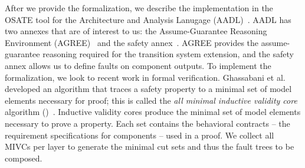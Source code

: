 After we provide the formalization, we describe the implementation in the OSATE tool for the Architecture and Analysis Lanugage (AADL)~\cite{FeilerModelBasedEngineering2012}. AADL has two annexes that are of interest to us: the Assume-Guarantee Reasoning Environment (AGREE)~\cite{NFM2012:CoGaMiWhLaLu} and the safety annex~\cite{stewart2020safety}. AGREE provides the assume-guarantee reasoning required for the transition system extension, and the safety annex allows us to define faults on component outputs. To implement the formalization, we look to recent work in formal verification. Ghassabani et al. developed an algorithm that traces a safety property to a minimal set of model elements necessary for proof; this is called the \textit{all minimal inductive validity core} algorithm (\aivcalg)~\cite{GhassabaniGW16,Ghassabani2017EfficientGO,bendik2018online}. Inductive validity cores produce the minimal set of model elements necessary to prove a property. Each set contains the behavioral contracts -- the requirement specifications for components -- used in a proof. We collect all MIVCs per layer to generate the minimal cut sets and thus the fault trees to be composed.




